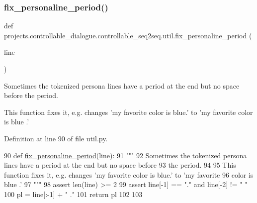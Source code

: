 \subsubsection{\texorpdfstring{fix\+\_\+personaline\+\_\+period()}{fix\_personaline\_period()}}
{\footnotesize\ttfamily def projects.\+controllable\+\_\+dialogue.\+controllable\+\_\+seq2seq.\+util.\+fix\+\_\+personaline\+\_\+period (\begin{DoxyParamCaption}\item[{}]{line }\end{DoxyParamCaption})}

\begin{DoxyVerb}Sometimes the tokenized persona lines have a period at the end but no space before
the period.

This function fixes it, e.g. changes 'my favorite color is blue.' to 'my favorite
color is blue .'
\end{DoxyVerb}
 

Definition at line 90 of file util.\+py.


\begin{DoxyCode}
90 \textcolor{keyword}{def }\hyperlink{namespaceprojects_1_1controllable__dialogue_1_1controllable__seq2seq_1_1util_a21f7e685d288dffc51d76664b3f31859}{fix\_personaline\_period}(line):
91     \textcolor{stringliteral}{"""}
92 \textcolor{stringliteral}{    Sometimes the tokenized persona lines have a period at the end but no space before}
93 \textcolor{stringliteral}{    the period.}
94 \textcolor{stringliteral}{}
95 \textcolor{stringliteral}{    This function fixes it, e.g. changes 'my favorite color is blue.' to 'my favorite}
96 \textcolor{stringliteral}{    color is blue .'}
97 \textcolor{stringliteral}{    """}
98     \textcolor{keyword}{assert} len(line) >= 2
99     \textcolor{keyword}{assert} line[-1] == \textcolor{stringliteral}{"."} \textcolor{keywordflow}{and} line[-2] != \textcolor{stringliteral}{" "}
100     pl = line[:-1] + \textcolor{stringliteral}{" ."}
101     \textcolor{keywordflow}{return} pl
102 
103 
\end{DoxyCode}
\mbox{\label{namespaceprojects_1_1controllable__dialogue_1_1controllable__seq2seq_1_1util_accba1ac2dc7bedf184abe7d46120861c}} 
